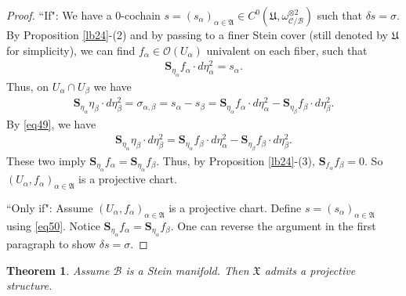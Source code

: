 \documentclass[12pt,a4paper,notitlepage]{article}
\theoremstyle{definition}
\theoremstyle{plain}
\newtheorem{thm}[df]{Theorem}
\newcommand{\fk}{\mathfrak}
\newcommand{\mc}{\mathcal}
\newcommand{\scr}{\mathscr}
\newcommand{\Sbf}{\mathbf{S}}
\numberwithin{equation}{section}
\begin{document}
\begin{proof}
	``If": We have a $0$-cochain $s=(s_\alpha)_{\alpha\in\fk A}\in C^0(\fk U,\omega_{\mc C/\mc B}^{\otimes 2})$ such that $\delta s=\sigma$. By Proposition \ref{lb24}-(2) and by passing to a finer Stein cover (still denoted by $\fk U$ for simplicity), we can find $f_\alpha\in\scr O(U_\alpha)$ univalent on each fiber, such that
	\begin{align}
	\Sbf_{\eta_\alpha}f_\alpha\cdot d\eta_\alpha^2=s_\alpha.\label{eq50}
	\end{align}
	Thus, on $U_\alpha\cap U_\beta$ we have
	\begin{align*}
	\Sbf_{\eta_\alpha}\eta_\beta\cdot d\eta_\beta^2=\sigma_{\alpha,\beta}=s_\alpha-s_\beta=\Sbf_{\eta_\alpha}f_\alpha\cdot d\eta_\alpha^2-\Sbf_{\eta_\beta}f_\beta\cdot d\eta_\beta^2.
	\end{align*}
	By \eqref{eq49}, we have
	\begin{align*}
	\Sbf_{\eta_\alpha}\eta_\beta\cdot d\eta_\beta^2=\Sbf_{\eta_\alpha}f_\beta\cdot d\eta_\alpha^2-\Sbf_{\eta_\beta}f_\beta\cdot d\eta_\beta^2.
	\end{align*}
	These two imply $\Sbf_{\eta_\alpha}f_\alpha=\Sbf_{\eta_\alpha}f_\beta$. Thus, by Proposition \ref{lb24}-(3), $\Sbf_{f_\alpha}f_\beta=0$. So $(U_\alpha,f_\alpha)_{\alpha\in\fk A}$ is a projective chart.
	
	``Only if": Assume $(U_\alpha,f_\alpha)_{\alpha\in\fk A}$ is a projective chart. Define $s=(s_\alpha)_{\alpha\in\fk A}$ using \eqref{eq50}. Notice $\Sbf_{\eta_\alpha}f_\alpha=\Sbf_{\eta_\alpha}f_\beta$. One can reverse the argument in the first paragraph to show $\delta s=\sigma$.
\end{proof}


\begin{thm}\label{lb40}
	Assume $\mc B$ is a Stein manifold. Then $\fk X$ admits a projective structure.
\end{thm}
\end{document}
